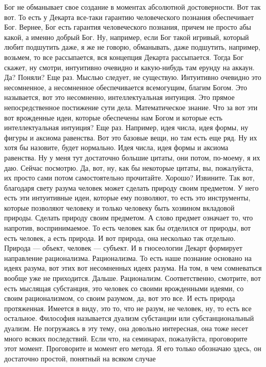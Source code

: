 Бог не обманывает свое создание в моментах абсолютной достоверности. Вот так
вот. То есть у Декарта все-таки гарантию человеческого познания обеспечивает
Бог. Вернее, Бог есть гарантия человеческого познания, причем не просто абы
какой, а именно добрый Бог. Ну, например, если Бог такой игривый, который любит
подшутить даже, я же не говорю, обманывать, даже подшутить, например, возьмем,
то все рассыпается, вся концепция Декарта рассыпается. Тогда Бог скажет, ну
смотри, интуитивно очевидно и какую-нибудь там ерунду на аккаун. Да? Поняли? Еще
раз. Мыслью следует, не существую. Интуитивно очевидно это несомненное, а
несомненное обеспечивается всемогущим, благим Богом. Это называется, вот это
несомненно, интеллектуальная интуиция. Это прямое непосредственное постижение
сути дела. Математическое знание. Что за вот эти вот врожденные идеи, которые
обеспечены нам Богом и которые есть интеллектуальная интуиция? Еще раз.
Например, идея числа, идея формы, ну фигуры и аксиома равенства. Вот это базовые
вещи, но там есть еще ряд. Ну их хотя бы назовите, будет нормально. Идея числа,
идея формы и аксиома равенства. Ну у меня тут достаточно большие цитаты, они
потом, по-моему, я их даю. Сейчас посмотрю. Да, вот, ну, как бы некоторые
цитаты, вы, пожалуйста, их просто сами потом самостоятельно прочитайте. Хорошо?
Извините. Так вот, благодаря свету разума человек может сделать природу своим
предметом. У него есть эти интуитивные идеи, которые ему позволяют, то есть это
инструменты, которые позволяют человеку и только человеку быть хозяином
вкладовой природы. Сделать природу своим предметом. А слово предмет означает то,
что напротив, воспринимаемое. То есть человек как бы отделился от природы, вот
есть человек, а есть природа. И вот природа, она несколько так отдельно. Природа
— объект, человек — субъект. И в гносеологии Декарт формирует направление
рационализма. Рационализма. То есть наше познание основано на идеях разума, вот
этих вот несомненных идеях разума. На том, в чем сомневаться вообще уже не
приходится. Дальше. Рационализм. Соответственно, смотрите, вот есть мыслящая
субстанция, это человек со своими врожденными идеями, со своим рационализмом, со
своим разумом, да, вот это все. И есть природа протяженная. Имеется в виду, это
то, что не разум, не человек, ну, то есть все остальное. Философия называется
дуализм субстанции или субстанциональный дуализм. Не погружаясь в эту тему, она
довольно интересная, она тоже несет много всяких последствий. Если что, на
семинарах, пожалуйста, проговорите этот момент. Проговорите и момент его метода.
Я его только обозначаю здесь, он достаточно простой, понятный на всяком случае
